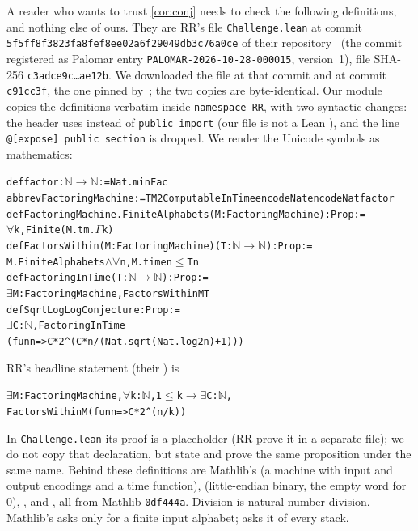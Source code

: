 \documentclass[10pt]{amsart}
\theoremstyle{plain}
\theoremstyle{definition}
\theoremstyle{remark}
\numberwithin{equation}{section}
\begin{document}
A reader who wants to trust \cref{cor:conj} needs to check the following definitions, and nothing
else of ours. They are RR's file \texttt{Challenge.lean} at commit
\texttt{5f5ff8f3823fa8fef8ee02a6f29049db3c76a0ce} of their repository~\cite{RRrepo} (the commit
registered as Palomar entry \texttt{PALOMAR-2026-10-28-000015}, version~1), file SHA-256
\texttt{c3adce9c\ldots ae12b}. We downloaded the file at that commit and at commit \texttt{c91cc3f},
the one pinned by~\cite{IF26}; the two copies are byte-identical. Our module  copies
the definitions verbatim inside \texttt{namespace RR}, with two syntactic changes: the header uses
 instead of \texttt{public import} (our file is not a Lean ), and the line
\texttt{@[expose] public section} is dropped. We render the Unicode symbols as mathematics:
\begin{alltt}
def factor : \(\mathbb{N}\to\mathbb{N}\) := Nat.minFac
abbrev FactoringMachine := TM2ComputableInTime encodeNat encodeNat factor
def FactoringMachine.FiniteAlphabets (M : FactoringMachine) : Prop :=
  \(\forall\) k, Finite (M.tm.\(\Gamma\) k)
def FactorsWithin (M : FactoringMachine) (T : \(\mathbb{N}\to\mathbb{N}\)) : Prop :=
  M.FiniteAlphabets \(\wedge\) \(\forall\) n, M.time n \(\le\) T n
def FactoringInTime (T : \(\mathbb{N}\to\mathbb{N}\)) : Prop :=
  \(\exists\) M : FactoringMachine, FactorsWithin M T
def SqrtLogLogConjecture : Prop :=
  \(\exists\) C : \(\mathbb{N}\), FactoringInTime
    (fun n => C * 2 ^ (C * n / (Nat.sqrt (Nat.log 2 n) + 1)))
\end{alltt}
RR's headline statement (their ) is
\begin{alltt}
\(\exists\) M : FactoringMachine, \(\forall\) k : \(\mathbb{N}\), 1 \(\le\) k \(\to\) \(\exists\) C : \(\mathbb{N}\),
  FactorsWithin M (fun n => C * 2 ^ (n / k))
\end{alltt}
In \texttt{Challenge.lean} its proof is a placeholder (RR prove it in a separate file); we do not copy that
declaration, but state and prove the same proposition under the same name. Behind these definitions
are Mathlib's  (a  machine with input and output
encodings and a time function),  (little-endian binary, the empty word
for $0$), ,  and , all from Mathlib \texttt{0df444a}. Division
is natural-number division. Mathlib's  asks only for a finite input alphabet;
 asks it of every stack.
\end{document}
